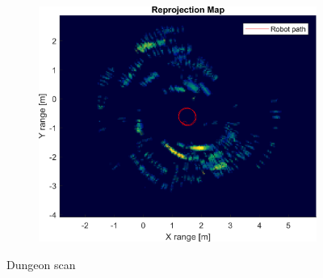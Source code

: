 \begin{figure}[htbp]
\begin{subfigure}[t]{0.475\linewidth}
    \end{subfigure}\bigskip\\
    \begin{subfigure}[t]{0.5\linewidth}
        \centering
        \includegraphics[width=\linewidth,max height=.475\textheight]{gfx/results/dungeon_reprojection.png}
    \end{subfigure}%
    \caption{Dungeon scan}
\end{figure}

